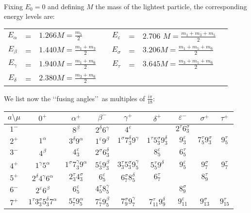 \documentclass[a4paper,12pt]{report}
\begin{document}
Fixing $E_{0}=0$ and defining $M$ the mass of the lightest particle, the corresponding energy levels are:

\begin{center}
\begin{tabular}{cclc|cclc|}
$E_{\alpha}$ &=& $1.266 M =\frac{m_{5}}{2}$ && $E_{\varepsilon}$ &=&2.706 $M =\frac{m_{1}+m_{3}+m_{5}}{2}$ \\
$E_{\beta}$ &=& $1.440 M =\frac{m_{1}+m_{3}}{2}$ && $E_{\sigma}$ &=& $3.206 M =\frac{m_{1}+m_{5}+m_{6}}{2}$ \\
$E_{\gamma}$ &=& $1.940 M =\frac{m_{1}+m_{6}}{2}$ && $E_{\tau}$ &=& $3.645 M =\frac{m_{3}+m_{5}+m_{6}}{2}$ \\
$E_{\delta}$ &=& $2.380 M =\frac{m_{3}+m_{6}}{2}$ && \\
\end{tabular}
\end{center}

\vspace{0.5cm}

We list now the \lq\lq fusing angles\rq\rq \, as multiples of $\frac{i\pi}{18}$:

\begin{center}
\begin{tabular}{|c|c|c|c|c|c|c|c|c|}\hline
 $ a\setminus\mu$  &  $ 0^{+}$  &  $ \alpha^{+}$ &  $ \beta^{-}$ &  $ \gamma^{+}$& $\delta^{+}$ & $\varepsilon^{-}$ & $\sigma^{+}$ & $\tau^{+}$\\ \hline
 $1^{-}$ &   &  $8^{\beta}$ &  $2^{\delta}6^{\gamma}$ &  $4^{\varepsilon}$ &  & $2^{\tau}6_{3}^{\sigma}$ &  & \\ \hline
  $2^{+}$ & $1^{\alpha}$  & $3^{\delta}9^{\alpha}$ & $1^{\varepsilon}9^{\beta}$ & $1^{\sigma}7_{3}^{\delta}9^{\gamma}$ & $1^{\tau}5_{3}^{\sigma}9_{3}^{\delta}$ & $9_{3}^{\varepsilon}$ & $7_{5}^{\tau}9_{3}^{\sigma}$ & $9_{5}^{\tau}$\\ \hline
  $3^{-}$ & $4^{\beta}$   & $4_{3}^{\varepsilon}$ & $2^{\sigma}6_{3}^{\delta}$ & & $8_{5}^{\varepsilon}$ & $6_{5}^{\tau}$ &  & \\ \hline
  $4^{+}$ & $1^{\gamma}5^{\alpha}$ &  $1^{\sigma}7_{3}^{\gamma}9^{\alpha}$ & $5_{3}^{\varepsilon}9_{3}^{\beta}$ & $3_{3}^{\tau}5_{3}^{\sigma}9_{5}^{\gamma}$ & $5_{5}^{\tau}9^{\delta}$ & $9_{5}^{\varepsilon}$ & $9_{7}^{\sigma}$ & $9_{7}^{\tau}$\\ \hline
  $5^{+}$ & $2^{\delta}4^{\gamma}6^{\alpha}$ &  $2_{3}^{\tau}4_{3}^{\sigma}$ & $6_{5}^{\varepsilon}$ & $6_{7}^{\sigma}8_{5}^{\delta}$ & $6_{7}^{\tau}$ &  & $8_{9}^{\tau}$ & \\ \hline
  $6^{-}$ & $2^{\varepsilon}6^{\beta}$    & $6_{5}^{\varepsilon}$ & $4_{5}^{\tau}8_{5}^{\gamma}$ &  & & $8_{9}^{\sigma}$ &  & \\ \hline
  $7^{+}$ & $1^{\tau}3_{3}^{\sigma}5_{3}^{\delta}7^{\alpha}$  & $5_{7}^{\tau}9_{5}^{\alpha}$ & $7_{7}^{\varepsilon}9_{5}^{\beta}$ & $7_{9}^{\sigma}9_{7}^{\gamma}$ & $7_{11}^{\tau}9_{9}^{\delta}$ & $9_{11}^{\varepsilon}$ & $9_{13}^{\sigma}$ & $9_{15}^{\tau}$\\ \hline

  \end{tabular}
\end{center}
\end{document}
